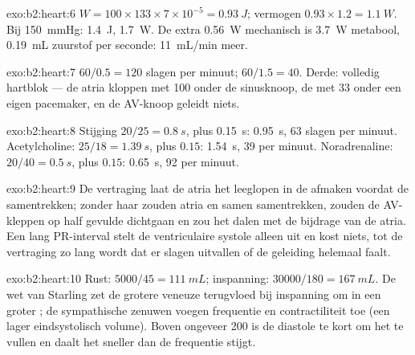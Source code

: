 \begin{solution}{exo:b2:heart:6}
$W = 100\times 133\times 7\times 10^{-5} = \qty{0.93}{J}$; vermogen
$0.93\times 1.2 = \qty{1.1}{W}$. Bij \qty{150}{mmHg}: \qty{1.4}{J},
\qty{1.7}{W}. De extra \qty{0.56}{W} mechanisch is \qty{3.7}{W}
metabool, \qty{0.19}{mL} zuurstof per seconde: \qty{11}{mL/min} meer.
\end{solution}

\begin{solution}{exo:b2:heart:7}
$60/0.5 = 120$ slagen per minuut; $60/1.5 = 40$. Derde: volledig hartblok
--- de atria kloppen met 100 onder de sinusknoop, de  met 33 onder
een eigen pacemaker, en de AV-knoop geleidt niets.
\end{solution}

\begin{solution}{exo:b2:heart:8}
Stijging $20/25 = \qty{0.8}{s}$, plus \qty{0.15}{s}: \qty{0.95}{s}, 63
slagen per minuut. Acetylcholine: $25/18 = \qty{1.39}{s}$, plus $0.15$:
\qty{1.54}{s}, 39 per minuut. Noradrenaline: $20/40 = \qty{0.5}{s}$,
plus $0.15$: \qty{0.65}{s}, 92 per minuut.
\end{solution}

\begin{solution}{exo:b2:heart:9}
De vertraging laat de atria het leeglopen in de  afmaken voordat
de  samentrekken; zonder haar zouden atria en  samen
samentrekken, zouden de AV-kleppen op half gevulde  dichtgaan en
zou het  dalen met de bijdrage van de atria. Een lang PR-interval
stelt de ventriculaire systole alleen uit en kost niets, tot de vertraging
zo lang wordt dat er slagen uitvallen of de geleiding helemaal faalt.
\end{solution}

\begin{solution}{exo:b2:heart:10}
Rust: $5000/45 = \qty{111}{mL}$; inspanning: $\num{30000}/180 =
\qty{167}{mL}$. De wet van Starling zet de grotere veneuze terugvloed bij
inspanning om in een groter ; de sympathische zenuwen voegen
frequentie en contractiliteit toe (een lager eindsystolisch volume). Boven
ongeveer 200 is de diastole te kort om het  te vullen en daalt het
 sneller dan de frequentie stijgt.
\end{solution}


